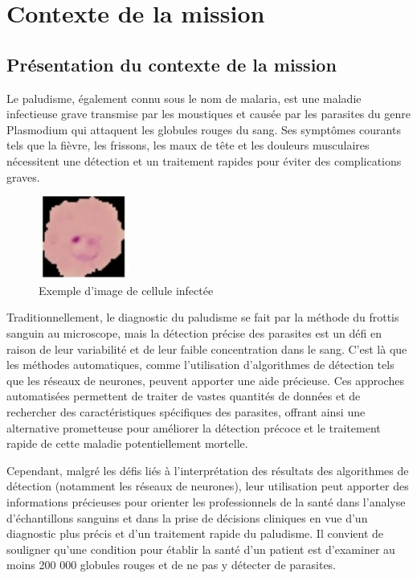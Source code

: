 \documentclass{report}
\begin{document}
{\chapter{Contexte de la mission }

\section{Présentation du contexte de la mission}
\hspace{1.4cm}Le paludisme, également connu sous le nom de malaria, est une maladie infectieuse grave transmise par les moustiques et causée par les parasites du genre Plasmodium qui attaquent les globules rouges du sang. Ses symptômes courants tels que la fièvre, les frissons, les maux de tête et les douleurs musculaires nécessitent une détection et un traitement rapides pour éviter des complications graves.
\begin{figure}[htbp] 
	\centering
        \includegraphics[width=3cm]{logo/Malaria_img_inf.png} 
	\caption{Exemple d'image de cellule infectée}
	\label{fig:Exemple image de cellule infectée}
\end{figure}

\hspace{1.4cm}Traditionnellement, le diagnostic du paludisme se fait par la méthode du frottis sanguin au microscope, mais la détection précise des parasites est un défi en raison de leur variabilité et de leur faible concentration dans le sang. C'est là que les méthodes automatiques, comme l'utilisation d'algorithmes de détection tels que les réseaux de neurones, peuvent apporter une aide précieuse. Ces approches automatisées permettent de traiter de vastes quantités de données et de rechercher des caractéristiques spécifiques des parasites, offrant ainsi une alternative prometteuse pour améliorer la détection précoce et le traitement rapide de cette maladie potentiellement mortelle.
\vspace*{0.5\baselineskip}

\hspace{1.6cm}Cependant, malgré les défis liés à l'interprétation des résultats des algorithmes de détection (notamment les réseaux de neurones), leur utilisation peut apporter des informations précieuses pour orienter les professionnels de la santé dans l'analyse d'échantillons sanguins et dans la prise de décisions cliniques en vue d'un diagnostic plus précis et d'un traitement rapide du paludisme. Il convient de souligner qu'une condition pour établir la santé d'un patient est d'examiner au moins 200 000 globules rouges et de ne pas y détecter de parasites.

}
\end{document}
